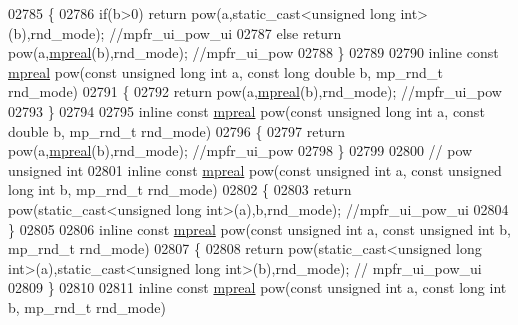 \begin{DoxyCode}
{{02785 \{
02786     \textcolor{keywordflow}{if}(b>0)    \textcolor{keywordflow}{return} pow(a,static\_cast<unsigned long int>(b),rnd\_mode); \textcolor{comment}{//mpfr\_ui\_pow\_ui}
02787     \textcolor{keywordflow}{else}       \textcolor{keywordflow}{return} pow(a,\hyperlink{classmpfr_1_1mpreal}{mpreal}(b),rnd\_mode); \textcolor{comment}{//mpfr\_ui\_pow}
02788 \}
02789 
02790 \textcolor{keyword}{inline} \textcolor{keyword}{const} \hyperlink{classmpfr_1_1mpreal}{mpreal} pow(\textcolor{keyword}{const} \textcolor{keywordtype}{unsigned} \textcolor{keywordtype}{long} \textcolor{keywordtype}{int} a, \textcolor{keyword}{const} \textcolor{keywordtype}{long} \textcolor{keywordtype}{double} b, mp\_rnd\_t rnd\_mode)
02791 \{
02792     \textcolor{keywordflow}{return} pow(a,\hyperlink{classmpfr_1_1mpreal}{mpreal}(b),rnd\_mode); \textcolor{comment}{//mpfr\_ui\_pow}
02793 \}
02794 
02795 \textcolor{keyword}{inline} \textcolor{keyword}{const} \hyperlink{classmpfr_1_1mpreal}{mpreal} pow(\textcolor{keyword}{const} \textcolor{keywordtype}{unsigned} \textcolor{keywordtype}{long} \textcolor{keywordtype}{int} a, \textcolor{keyword}{const} \textcolor{keywordtype}{double} b, mp\_rnd\_t rnd\_mode)
02796 \{
02797     \textcolor{keywordflow}{return} pow(a,\hyperlink{classmpfr_1_1mpreal}{mpreal}(b),rnd\_mode); \textcolor{comment}{//mpfr\_ui\_pow}
02798 \}
02799 
02800 \textcolor{comment}{// pow unsigned int}
02801 \textcolor{keyword}{inline} \textcolor{keyword}{const} \hyperlink{classmpfr_1_1mpreal}{mpreal} pow(\textcolor{keyword}{const} \textcolor{keywordtype}{unsigned} \textcolor{keywordtype}{int} a, \textcolor{keyword}{const} \textcolor{keywordtype}{unsigned} \textcolor{keywordtype}{long} \textcolor{keywordtype}{int} b, mp\_rnd\_t rnd\_mode)
02802 \{
02803     \textcolor{keywordflow}{return} pow(static\_cast<unsigned long int>(a),b,rnd\_mode); \textcolor{comment}{//mpfr\_ui\_pow\_ui}
02804 \}
02805 
02806 \textcolor{keyword}{inline} \textcolor{keyword}{const} \hyperlink{classmpfr_1_1mpreal}{mpreal} pow(\textcolor{keyword}{const} \textcolor{keywordtype}{unsigned} \textcolor{keywordtype}{int} a, \textcolor{keyword}{const} \textcolor{keywordtype}{unsigned} \textcolor{keywordtype}{int} b, mp\_rnd\_t rnd\_mode)
02807 \{
02808     \textcolor{keywordflow}{return} pow(static\_cast<unsigned long int>(a),static\_cast<unsigned long int>(b),rnd\_mode); \textcolor{comment}{//
      mpfr\_ui\_pow\_ui}
02809 \}
02810 
02811 \textcolor{keyword}{inline} \textcolor{keyword}{const} \hyperlink{classmpfr_1_1mpreal}{mpreal} pow(\textcolor{keyword}{const} \textcolor{keywordtype}{unsigned} \textcolor{keywordtype}{int} a, \textcolor{keyword}{const} \textcolor{keywordtype}{long} \textcolor{keywordtype}{int} b, mp\_rnd\_t rnd\_mode)
}}
\end{DoxyCode}

